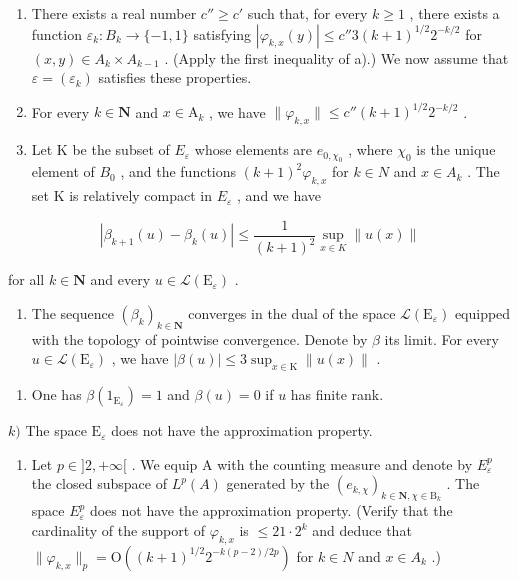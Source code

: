 \begin{enumerate}
\def\labelenumi{\alph{enumi})}
\setcounter{enumi}{5}
\item
  There exists a real number \(c'' \geqslant c'\) such that, for every \(k \geqslant 1\) , there exists a function \(\varepsilon_k \colon B_k \to \{-1,1\}\) satisfying \(|\varphi_{k,x}(y)| \leqslant c''3(k+1)^{1/2}2^{-k/2}\) for \((x,y) \in A_k \times A_{k-1}\) . (Apply the first inequality of a).) We now assume that \(\varepsilon = (\varepsilon_k)\) satisfies these properties.
\item
  For every \(k \in \mathbf{N}\) and \(x \in \mathrm{A}_k\) , we have \(\| \varphi_{k,x} \| \leqslant c''(k + 1)^{1/2} 2^{-k/2}\) .
\item
  Let K be the subset of \(E_{\varepsilon}\) whose elements are \(e_{0,\chi_{0}}\) , where \(\chi_{0}\) is the unique element of \(B_{0}\) , and the functions \((k+1)^{2}\varphi_{k,x}\) for \(k\in N\) and \(x\in A_{k}\) . The set K is relatively compact in \(E_{\varepsilon}\) , and we have
\end{enumerate}

\[
| \beta_ {k + 1} (u) - \beta_ {k} (u) | \leqslant \frac {1}{(k + 1) ^ {2}} \sup _ {x \in K} \| u (x) \|
\]

for all \(k \in \mathbf{N}\) and every \(u \in \mathcal{L}(\mathrm{E}_{\varepsilon})\) .

\begin{enumerate}
\def\labelenumi{\roman{enumi})}
\tightlist
\item
  The sequence \((\beta_{k})_{k\in \mathbf{N}}\) converges in the dual of the space \(\mathcal{L}(\mathrm{E}_{\varepsilon})\) equipped with the topology of pointwise convergence. Denote by \(\beta\) its limit. For every \(u\in \mathcal{L}(\mathrm{E}_{\varepsilon})\) , we have \(|\beta (u)|\leqslant 3\sup_{x\in \mathrm{K}}\| u(x)\|\) .
\end{enumerate}

\begin{enumerate}
\def\labelenumi{\alph{enumi})}
\setcounter{enumi}{9}
\tightlist
\item
  One has \(\beta(1_{\mathrm{E}_{\varepsilon}})=1\) and \(\beta(u)=0\) if \(u\) has finite rank.
\end{enumerate}

\(k)\) The space \(\mathrm{E}_{\varepsilon}\) does not have the approximation property.

\begin{enumerate}
\def\labelenumi{\alph{enumi})}
\setcounter{enumi}{11}
\tightlist
\item
  Let \(p \in]2, +\infty[\) . We equip A with the counting measure and denote by \(E_{\varepsilon}^{p}\) the closed subspace of \(L^{p}(A)\) generated by the \((e_{k,\chi})_{k \in \mathbf{N}, \chi \in \mathrm{B}_{k}}\) . The space \(E_{\varepsilon}^{p}\) does not have the approximation property. (Verify that the cardinality of the support of \(\varphi_{k,x}\) is \(\leqslant 21 \cdot 2^{k}\) and deduce that \(\|\varphi_{k,x}\|_{p} = \mathrm{O}((k+1)^{1/2}2^{-k(p-2)/2p})\) for \(k \in N\) and \(x \in A_{k}\) .)
\end{enumerate}

